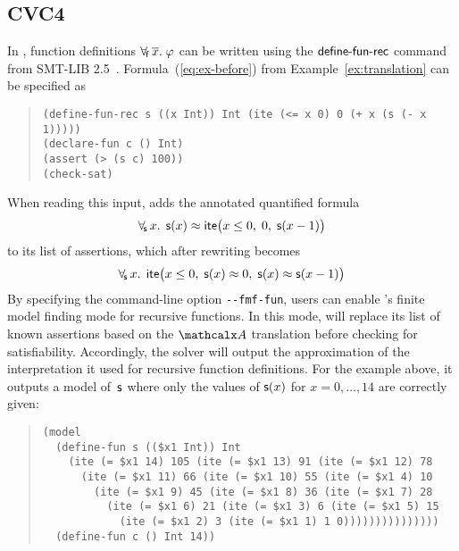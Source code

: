 \subsection{CVC4}
\label{ssec:cvc4}


In \cvc, function definitions $\forall_{\!\mathsf{f}\:} \overline{x}.\; \varphi$ can be written using the $\mathsf{define}\text{-}\mathsf{fun}\text{-}\mathsf{rec}$ command
from SMT-LIB 2.5~\cite{smtlib25}.
Formula~(\ref{eq:ex-before}) from Example~\ref{ex:translation}
can be specified as %
%
\begin{quote}
\verb|(define-fun-rec s ((x Int)) Int (ite (<= x 0) 0 (+ x (s (- x 1)))))|\kern-200mm \\
\verb|(declare-fun c () Int)| \\
\verb|(assert (> (s c) 100))| \\
\verb|(check-sat)|
\end{quote}
%
When reading this input,
\cvc adds the annotated quantified formula
$$\forall_{\!\mathsf{s}\:} x.\;\, \mathsf{s}( x ) \approx \mathsf{ite}\bigl( x \leq 0,\; 0,\; \mathsf{s}( x-1 )\bigr)$$
to its list of assertions,
which after rewriting becomes
$$\forall_{\!\mathsf{s}\:} x.\;\, \mathsf{ite}\bigl( x \leq 0,\; \mathsf{s}( x ) \approx 0,\; \mathsf{s}( x ) \approx \mathsf{s}( x-1 ) \bigr)$$
By specifying the command-line option \texttt{-}\texttt{-fmf-fun}, users
can enable \cvc's finite model finding mode for recursive functions.
In this mode, \cvc will replace its list of known
assertions based on the $\conv$ translation before checking for satisfiability.
Accordingly, the solver will output the approximation of the interpretation it
used for recursive function definitions.
For the example above, it outputs a %
model of~$\mathsf{s}$ where only
the values of $\mathsf{s}(x)$ for $x = 0,\ldots,14$ are correctly given:
\begin{quote}
\begin{verbatim}
(model
  (define-fun s (($x1 Int)) Int
    (ite (= $x1 14) 105 (ite (= $x1 13) 91 (ite (= $x1 12) 78
      (ite (= $x1 11) 66 (ite (= $x1 10) 55 (ite (= $x1 4) 10
        (ite (= $x1 9) 45 (ite (= $x1 8) 36 (ite (= $x1 7) 28
          (ite (= $x1 6) 21 (ite (= $x1 3) 6 (ite (= $x1 5) 15
            (ite (= $x1 2) 3 (ite (= $x1 1) 1 0)))))))))))))))
  (define-fun c () Int 14))
\end{verbatim}
\end{quote}

